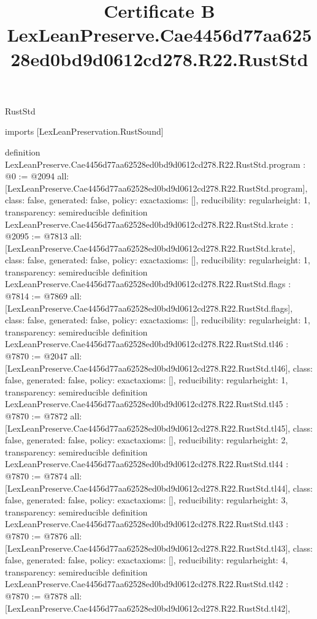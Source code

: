 \begin{lexlean}{RustStd}
\title{Certificate B LexLeanPreserve.Cae4456d77aa62528ed0bd9d0612cd278.R22.RustStd}
\begin{coremodule}
imports [LexLeanPreservation.RustSound]

definition LexLeanPreserve.Cae4456d77aa62528ed0bd9d0612cd278.R22.RustStd.program : @0 := @2094 {
  all: [LexLeanPreserve.Cae4456d77aa62528ed0bd9d0612cd278.R22.RustStd.program],
  class: false,
  generated: false,
  policy: exact{axioms: []},
  reducibility: regular{height: 1},
  transparency: semireducible
}
definition LexLeanPreserve.Cae4456d77aa62528ed0bd9d0612cd278.R22.RustStd.krate : @2095 := @7813 {
  all: [LexLeanPreserve.Cae4456d77aa62528ed0bd9d0612cd278.R22.RustStd.krate],
  class: false,
  generated: false,
  policy: exact{axioms: []},
  reducibility: regular{height: 1},
  transparency: semireducible
}
definition LexLeanPreserve.Cae4456d77aa62528ed0bd9d0612cd278.R22.RustStd.flags : @7814 := @7869 {
  all: [LexLeanPreserve.Cae4456d77aa62528ed0bd9d0612cd278.R22.RustStd.flags],
  class: false,
  generated: false,
  policy: exact{axioms: []},
  reducibility: regular{height: 1},
  transparency: semireducible
}
definition LexLeanPreserve.Cae4456d77aa62528ed0bd9d0612cd278.R22.RustStd.tl46 : @7870 := @2047 {
  all: [LexLeanPreserve.Cae4456d77aa62528ed0bd9d0612cd278.R22.RustStd.tl46],
  class: false,
  generated: false,
  policy: exact{axioms: []},
  reducibility: regular{height: 1},
  transparency: semireducible
}
definition LexLeanPreserve.Cae4456d77aa62528ed0bd9d0612cd278.R22.RustStd.tl45 : @7870 := @7872 {
  all: [LexLeanPreserve.Cae4456d77aa62528ed0bd9d0612cd278.R22.RustStd.tl45],
  class: false,
  generated: false,
  policy: exact{axioms: []},
  reducibility: regular{height: 2},
  transparency: semireducible
}
definition LexLeanPreserve.Cae4456d77aa62528ed0bd9d0612cd278.R22.RustStd.tl44 : @7870 := @7874 {
  all: [LexLeanPreserve.Cae4456d77aa62528ed0bd9d0612cd278.R22.RustStd.tl44],
  class: false,
  generated: false,
  policy: exact{axioms: []},
  reducibility: regular{height: 3},
  transparency: semireducible
}
definition LexLeanPreserve.Cae4456d77aa62528ed0bd9d0612cd278.R22.RustStd.tl43 : @7870 := @7876 {
  all: [LexLeanPreserve.Cae4456d77aa62528ed0bd9d0612cd278.R22.RustStd.tl43],
  class: false,
  generated: false,
  policy: exact{axioms: []},
  reducibility: regular{height: 4},
  transparency: semireducible
}
definition LexLeanPreserve.Cae4456d77aa62528ed0bd9d0612cd278.R22.RustStd.tl42 : @7870 := @7878 {
  all: [LexLeanPreserve.Cae4456d77aa62528ed0bd9d0612cd278.R22.RustStd.tl42],
}
\end{coremodule}
\end{lexlean}
